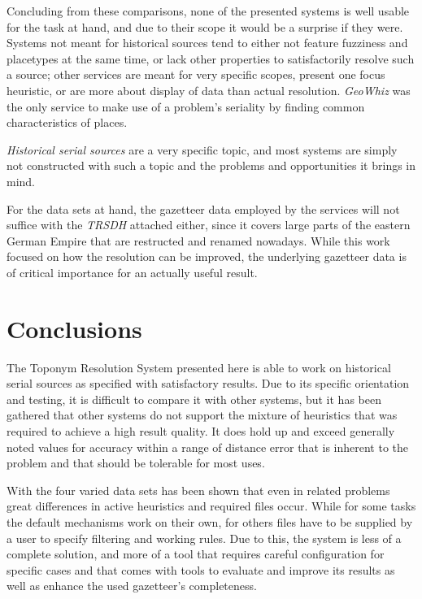 \documentclass[11pt]{article}
\begin{document}
Concluding from these comparisons, none of the presented systems is well usable for the task at hand, and due to their scope it would be a surprise if they were. Systems not meant for historical sources tend to either not feature fuzziness and placetypes at the same time, or lack other properties to satisfactorily resolve such a source; other services are meant for very specific scopes, present one focus heuristic, or are more about display of data than actual resolution. \emph{GeoWhiz} was the only service to make use of a problem's seriality by finding common characteristics of places.

\emph{Historical serial sources} are a very specific topic, and most systems are simply not constructed with such a topic and the problems and opportunities it brings in mind.

For the data sets at hand, the gazetteer data employed by the services will not suffice with the \emph{TRSDH} attached either, since it covers large parts of the eastern German Empire that are restructed and renamed nowadays. While this work focused on how the resolution can be improved, the underlying gazetteer data is of critical importance for an actually useful result.

\section{Conclusions}
The Toponym Resolution System presented here is able to work on historical serial sources as specified with satisfactory results. Due to its specific orientation and testing, it is difficult to compare it with other systems, but it has been gathered that other systems do not support the mixture of heuristics that was required to achieve a high result quality. It does hold up and exceed generally noted values for accuracy within a range of distance error that is inherent to the problem and that should be tolerable for most uses.

With the four varied data sets has been shown that even in related problems great differences in active heuristics and required files occur. While for some tasks the default mechanisms work on their own, for others files have to be supplied by a user to specify filtering and working rules. Due to this, the system is less of a complete solution, and more of a tool that requires careful configuration for specific cases and that comes with tools to evaluate and improve its results as well as enhance the used gazetteer's completeness.
\end{document}
